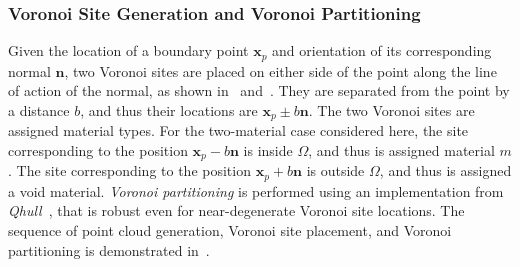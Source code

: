 \subsubsection{Voronoi Site Generation and Voronoi Partitioning}

Given the location of a boundary point $\bm{x}_p$ and orientation of its corresponding normal $\bm{n}$, two Voronoi sites are placed on either side of the point along the line of action of the normal, as shown in~ and~. They are separated from the point by a distance $b$, and thus their locations are $\bm{x}_p \pm b \bm{n}$. The two Voronoi sites are assigned material types. For the two-material case considered here, the site corresponding to the position $\bm{x}_p - b\bm{n}$ is inside $\Omega$, and thus is assigned material $m$. The site corresponding to the position $\bm{x}_p + b\bm{n}$ is outside $\Omega$, and thus is assigned a void material. \textit{Voronoi partitioning} is performed using an implementation from \textit{Qhull}~\cite{barber_1996}, that is robust even for near-degenerate Voronoi site locations. The sequence of point cloud generation, Voronoi site placement, and Voronoi partitioning is demonstrated in~.

